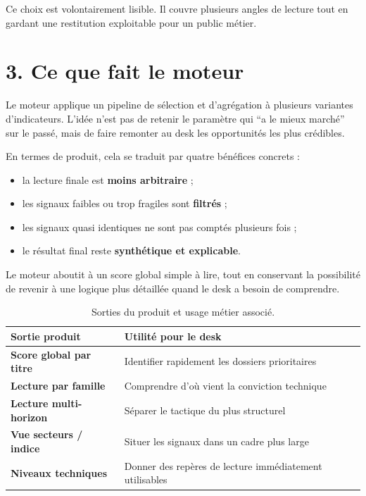 \documentclass[11pt,a4paper]{article}
\begin{document}
Ce choix est volontairement lisible. Il couvre plusieurs angles de lecture tout en gardant une restitution exploitable pour un public métier.

\section*{3. Ce que fait le moteur}

Le moteur applique un pipeline de sélection et d'agrégation à plusieurs variantes d'indicateurs. L'idée n'est pas de retenir le paramètre qui ``a le mieux marché'' sur le passé, mais de faire remonter au desk les opportunités les plus crédibles.

En termes de produit, cela se traduit par quatre bénéfices concrets :

\begin{itemize}
\item la lecture finale est \textbf{moins arbitraire} ;
\item les signaux faibles ou trop fragiles sont \textbf{filtrés} ;
\item les signaux quasi identiques ne sont pas comptés plusieurs fois ;
\item le résultat final reste \textbf{synthétique et explicable}.
\end{itemize}

Le moteur aboutit à un score global simple à lire, tout en conservant la possibilité de revenir à une logique plus détaillée quand le desk a besoin de comprendre.

\begin{table}[H]
\centering
\small
\begin{tabularx}{\textwidth}{>{\bfseries}p{3.2cm}X}
\toprule
Sortie produit & Utilité pour le desk \\
\midrule
Score global par titre & Identifier rapidement les dossiers prioritaires \\
Lecture par famille & Comprendre d'où vient la conviction technique \\
Lecture multi-horizon & Séparer le tactique du plus structurel \\
Vue secteurs / indice & Situer les signaux dans un cadre plus large \\
Niveaux techniques & Donner des repères de lecture immédiatement utilisables \\
\bottomrule
\end{tabularx}
\caption{Sorties du produit et usage métier associé.}
\end{table}
\end{document}
